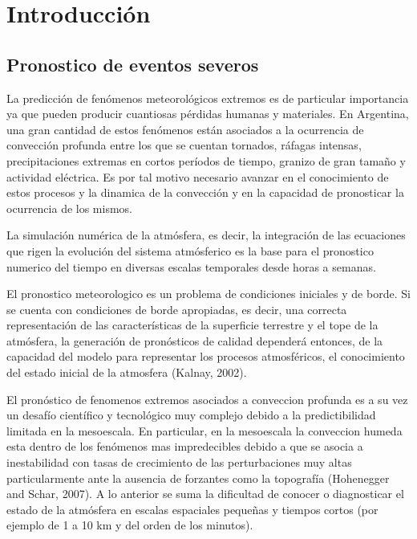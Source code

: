 \documentclass[12pt,oneside,a4paper]{reedthesis}
\begin{document}
\hypertarget{introducciuxf3n}{%
\chapter{Introducción}\label{introducciuxf3n}}

\hypertarget{pronostico-de-eventos-severos}{%
\section{Pronostico de eventos severos}\label{pronostico-de-eventos-severos}}

La predicción de fenómenos meteorológicos extremos es de particular importancia ya que pueden producir cuantiosas pérdidas humanas y materiales. En Argentina, una gran cantidad de estos fenómenos están asociados a la ocurrencia de convección profunda entre los que se cuentan tornados, ráfagas intensas, precipitaciones extremas en cortos períodos de tiempo, granizo de gran tamaño y actividad eléctrica. Es por tal motivo necesario avanzar en el conocimiento de estos procesos y la dinamica de la convección y en la capacidad de pronosticar la ocurrencia de los mismos.

La simulación numérica de la atmósfera, es decir, la integración de las ecuaciones que rigen la evolución del sistema atmósferico es la base para el pronostico numerico del tiempo en diversas escalas temporales desde horas a semanas.

El pronostico meteorologico es un problema de condiciones iniciales y de borde. Si se cuenta con condiciones de borde apropiadas, es decir, una correcta representación de las características de la superficie terrestre y el tope de la atmósfera, la generación de pronósticos de calidad dependerá entonces, de la capacidad del modelo para representar los procesos atmosféricos, el conocimiento del estado inicial de la atmosfera (Kalnay, 2002).

El pronóstico de fenomenos extremos asociados a conveccion profunda es a su vez un desafío científico y tecnológico muy complejo debido a la predictibilidad limitada en la mesoescala. En particular, en la mesoescala la conveccion humeda esta dentro de los fenómenos mas impredecibles debido a que se asocia a inestabilidad con tasas de crecimiento de las perturbaciones muy altas particularmente ante la ausencia de forzantes como la topografía (Hohenegger and Schar, 2007). A lo anterior se suma la dificultad de conocer o diagnosticar el estado de la atmósfera en escalas espaciales pequeñas y tiempos cortos (por ejemplo de 1 a 10 km y del orden de los minutos).
\end{document}
